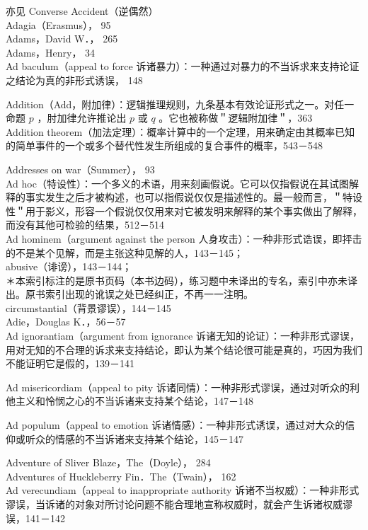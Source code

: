 亦见 Converse Accident（逆偶然）\\
Adagia（Erasmus）， 95\\
Adams，David W．， 265\\
Adams，Henry， 34\\
Ad baculum（appeal to force 诉诸暴力）：一种通过对暴力的不当诉求来支持论证之结论为真的非形式诱误， 148

Addition（Add，附加律）：逻辑推理规则，九条基本有效论证形式之一。对任一命题 $p$ ，肘加律允许推论出 $p$ 或 $q$ 。它也被称做＂逻辑附加律＂，363\\
Addition theorem（加法定理）：概率计算中的一个定理，用来确定由其概率已知的简单事件的一个或多个替代性发生所组成的复合事件的概率，543－548

Addresses on war（Summer）， 93\\
Ad hoc（特设性）：一个多义的术语，用来刻画假说。它可以仅指假说在其试图解释的事实发生之后才被构述，也可以指假说仅仅是描述性的。最一般而言，＂特设性＂用于影义，形容一个假说仅仅用来对它被发明来解释的某个事实做出了解释，而没有其他可检验的结果，512－514\\
Ad hominem（argument against the person 人身攻击）：一种非形式诰误，即抨击的不是某个见解，而是主张这种见解的人，143－145；\\
abusive（诽谤），143－144；\\
＊本索引标注的是原书页码（本书边码），练习题中未译出的专名，索引中亦未译出。原书索引出现的讹误之处已经纠正，不再一一注明。\\
circumstantial（背景谬误），144－145\\
Adie，Douglas K．，56－57\\
Ad ignorantiam（argument from ignorance 诉诸无知的论证）：一种非形式谬误，用对无知的不合理的诉求来支持结论，即认为某个结论很可能是真的，巧因为我们不能证明它是假的，139－141

Ad misericordiam（appeal to pity 诉诸同情）：一种非形式谬误，通过对听众的利他主义和怜悯之心的不当诉诸来支持某个结论，147－148

Ad populum（appeal to emotion 诉诸情感）：一种非形式诱误，通过对大众的信仰或听众的情感的不当诉诸来支持某个结论，145－147

Adventure of Sliver Blaze，The（Doyle）， 284\\
Adventures of Huckleberry Fin．The（Twain）， 162\\
Ad verecundiam（appeal to inappropriate authority 诉诸不当权威）：一种非形式谬误，当诉诸的对象对所讨论问题不能合理地宣称权威时，就会产生诉诸权威谬误，141－142

